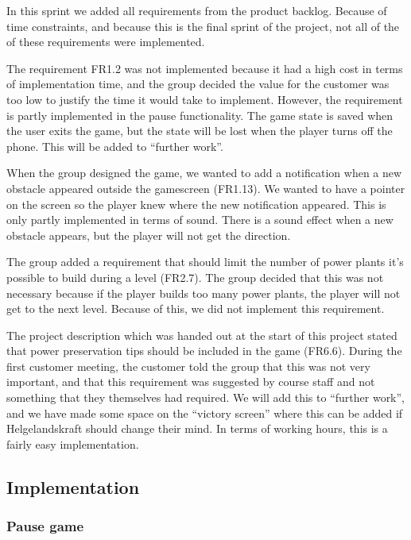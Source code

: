 	In this sprint we added all requirements from the product backlog. Because of time constraints,
	and because this is the final sprint of the project, not all of the of these requirements were
	implemented.

	The requirement FR1.2 was not implemented because it had a high cost in terms of implementation
	time, and the group decided the value for the customer was too low to justify the time it would
	take to implement. However, the requirement is partly implemented in the pause functionality.
	The game state is saved when the user exits the game, but the state will be lost when the player
	turns off the phone. This will be added to ``further work''.

	When the group designed the game, we wanted to add a notification when a new obstacle appeared
	outside the gamescreen (FR1.13). We wanted to have a pointer on the screen so the player knew
	where the new notification appeared. This is only partly implemented in terms of sound. There
	is a sound effect when a new obstacle appears, but the player will not get the direction.

	The group added a requirement that should limit the number of power plants it's possible to
	build during a level (FR2.7). The group decided that this was not necessary because if the
	player builds too many power plants, the player will not get to the next level. Because of this,
	we did not implement this requirement.

	The project description which was handed out at the start of this project stated that power
	preservation tips should be included in the game (FR6.6). During the first customer meeting,
	the customer told the group that this was not very important, and that this requirement was
	suggested by course staff and not something that they themselves had required. We will add
	this to ``further work'', and we have made some space on the ``victory screen'' where this can
	be added if Helgelandskraft should change their mind. In terms of working hours, this is a
	fairly easy implementation.

\subsection{Implementation}

	\subsubsection*{Pause game}

